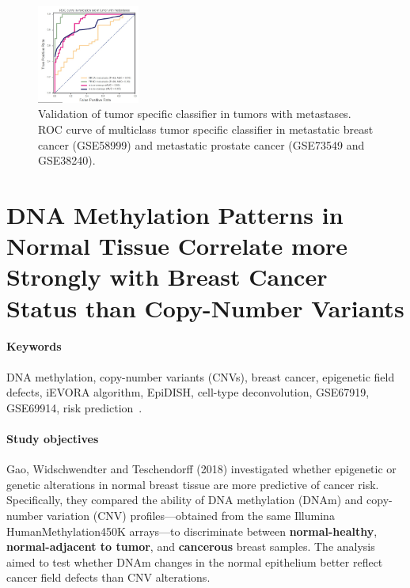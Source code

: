 \documentclass[10pt]{extarticle}
\begin{document}
\begin{figure}[H]
    \centering
    \includegraphics[width=0.3\textwidth]{Figures/Validation of tumor specific classifier in tumors with metastases.jpg} %
    \caption{Validation of tumor specific classifier in tumors with metastases. ROC curve of multiclass tumor specific classifier in
metastatic breast cancer (GSE58999) and metastatic prostate cancer (GSE73549 and GSE38240).}
    \label{fig:ROC}
\end{figure}

\section{DNA Methylation Patterns in Normal Tissue Correlate more Strongly with Breast Cancer Status than Copy-Number Variants}

\paragraph{Keywords}
DNA methylation, copy-number variants (CNVs), breast cancer, epigenetic field defects, iEVORA algorithm, EpiDISH, cell-type deconvolution, GSE67919, GSE69914, risk prediction~\cite{gao2018dnamethylation}.

\paragraph{Study objectives}
Gao, Widschwendter and Teschendorff (2018) investigated whether epigenetic or genetic alterations in normal breast tissue are more predictive of cancer risk. Specifically, they compared the ability of DNA methylation (DNAm) and copy-number variation (CNV) profiles—obtained from the same Illumina HumanMethylation450K arrays—to discriminate between \textbf{normal-healthy}, \textbf{normal-adjacent to tumor}, and \textbf{cancerous} breast samples. The analysis aimed to test whether DNAm changes in the normal epithelium better reflect cancer field defects than CNV alterations.
\end{document}
